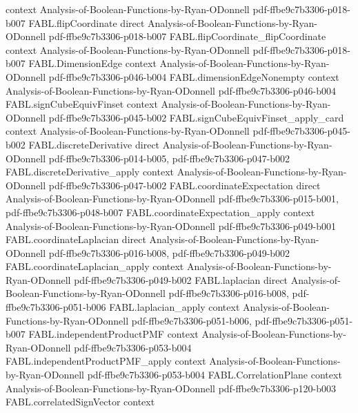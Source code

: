 \begin{theorem}
  {context}
  {Analysis-of-Boolean-Functions-by-Ryan-ODonnell}
  {pdf-ffbe9c7b3306-p018-b007}
\proofstep
  {FABL.flipCoordinate}
  {direct}
  {Analysis-of-Boolean-Functions-by-Ryan-ODonnell}
  {pdf-ffbe9c7b3306-p018-b007}
\proofstep
  {FABL.flipCoordinate_flipCoordinate}
  {context}
  {Analysis-of-Boolean-Functions-by-Ryan-ODonnell}
  {pdf-ffbe9c7b3306-p018-b007}
\proofstep
  {FABL.DimensionEdge}
  {context}
  {Analysis-of-Boolean-Functions-by-Ryan-ODonnell}
  {pdf-ffbe9c7b3306-p046-b004}
\proofstep
  {FABL.dimensionEdgeNonempty}
  {context}
  {Analysis-of-Boolean-Functions-by-Ryan-ODonnell}
  {pdf-ffbe9c7b3306-p046-b004}
\proofstep
  {FABL.signCubeEquivFinset}
  {context}
  {Analysis-of-Boolean-Functions-by-Ryan-ODonnell}
  {pdf-ffbe9c7b3306-p045-b002}
\proofstep
  {FABL.signCubeEquivFinset_apply_card}
  {context}
  {Analysis-of-Boolean-Functions-by-Ryan-ODonnell}
  {pdf-ffbe9c7b3306-p045-b002}
\proofstep
  {FABL.discreteDerivative}
  {direct}
  {Analysis-of-Boolean-Functions-by-Ryan-ODonnell}
  {pdf-ffbe9c7b3306-p014-b005,
    pdf-ffbe9c7b3306-p047-b002}
\proofstep
  {FABL.discreteDerivative_apply}
  {context}
  {Analysis-of-Boolean-Functions-by-Ryan-ODonnell}
  {pdf-ffbe9c7b3306-p047-b002}
\proofstep
  {FABL.coordinateExpectation}
  {direct}
  {Analysis-of-Boolean-Functions-by-Ryan-ODonnell}
  {pdf-ffbe9c7b3306-p015-b001,
    pdf-ffbe9c7b3306-p048-b007}
\proofstep
  {FABL.coordinateExpectation_apply}
  {context}
  {Analysis-of-Boolean-Functions-by-Ryan-ODonnell}
  {pdf-ffbe9c7b3306-p049-b001}
\proofstep
  {FABL.coordinateLaplacian}
  {direct}
  {Analysis-of-Boolean-Functions-by-Ryan-ODonnell}
  {pdf-ffbe9c7b3306-p016-b008,
    pdf-ffbe9c7b3306-p049-b002}
\proofstep
  {FABL.coordinateLaplacian_apply}
  {context}
  {Analysis-of-Boolean-Functions-by-Ryan-ODonnell}
  {pdf-ffbe9c7b3306-p049-b002}
\proofstep
  {FABL.laplacian}
  {direct}
  {Analysis-of-Boolean-Functions-by-Ryan-ODonnell}
  {pdf-ffbe9c7b3306-p016-b008,
    pdf-ffbe9c7b3306-p051-b006}
\proofstep
  {FABL.laplacian_apply}
  {context}
  {Analysis-of-Boolean-Functions-by-Ryan-ODonnell}
  {pdf-ffbe9c7b3306-p051-b006,
    pdf-ffbe9c7b3306-p051-b007}
\proofstep
  {FABL.independentProductPMF}
  {context}
  {Analysis-of-Boolean-Functions-by-Ryan-ODonnell}
  {pdf-ffbe9c7b3306-p053-b004}
\proofstep
  {FABL.independentProductPMF_apply}
  {context}
  {Analysis-of-Boolean-Functions-by-Ryan-ODonnell}
  {pdf-ffbe9c7b3306-p053-b004}
\proofstep
  {FABL.CorrelationPlane}
  {context}
  {Analysis-of-Boolean-Functions-by-Ryan-ODonnell}
  {pdf-ffbe9c7b3306-p120-b003}
\proofstep
  {FABL.correlatedSignVector}
  {context}

\end{theorem}
